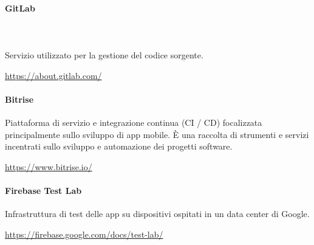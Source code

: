 		\paragraph{GitLab} \mbox{}\\ \mbox{}\\
		Servizio utilizzato per la gestione del codice sorgente.
		\newline
		\centerline{\url{https://about.gitlab.com/}}
		\begin{comment}
			\begin{figure}[H]
			\texttt{[image: res/images/""]}
			\caption{Software per la codifica}
			\end{figure} 
		\end{comment}
		\paragraph{Bitrise}
		Piattaforma di servizio e integrazione continua (CI / CD) focalizzata principalmente sullo sviluppo di app mobile. È una raccolta di strumenti e servizi incentrati sullo sviluppo e automazione dei progetti software. 
		\newline
		\centerline{\url{https://www.bitrise.io/}}
	\paragraph{Firebase Test Lab}
	Infrastruttura di test delle app su dispositivi ospitati in un data center di Google.
	\newline
		\centerline{\url{https://firebase.google.com/docs/test-lab/}}
	